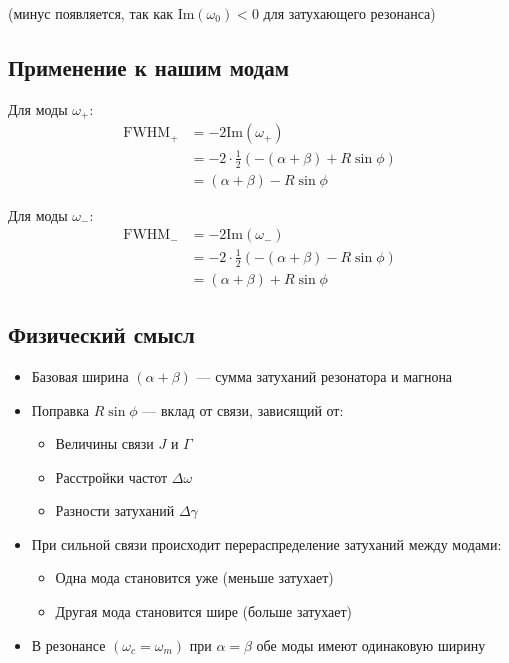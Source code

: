 \documentclass[12pt,a4paper]{article}
\begin{document}
(минус появляется, так как $\text{Im}(\omega_0) < 0$ для затухающего резонанса)

\subsection{Применение к нашим модам}

Для моды $\omega_+$:
\begin{align}
\text{FWHM}_+ &= -2\text{Im}(\omega_+) \nonumber \\
&= -2 \cdot \frac{1}{2}\left(-(\alpha + \beta) + R\sin\phi\right) \nonumber \\
&= (\alpha + \beta) - R\sin\phi
\end{align}

Для моды $\omega_-$:
\begin{align}
\text{FWHM}_- &= -2\text{Im}(\omega_-) \nonumber \\
&= -2 \cdot \frac{1}{2}\left(-(\alpha + \beta) - R\sin\phi\right) \nonumber \\
&= (\alpha + \beta) + R\sin\phi
\end{align}

\subsection{Физический смысл}

\begin{itemize}
\item Базовая ширина $(\alpha + \beta)$ — сумма затуханий резонатора и магнона
\item Поправка $R\sin\phi$ — вклад от связи, зависящий от:
\begin{itemize}
\item Величины связи $J$ и $\Gamma$
\item Расстройки частот $\Delta\omega$
\item Разности затуханий $\Delta\gamma$
\end{itemize}
\item При сильной связи происходит перераспределение затуханий между модами:
\begin{itemize}
\item Одна мода становится уже (меньше затухает)
\item Другая мода становится шире (больше затухает)
\end{itemize}
\item В резонансе $(\omega_c = \omega_m)$ при $\alpha = \beta$ обе моды имеют одинаковую ширину
\end{itemize}
\end{document}
